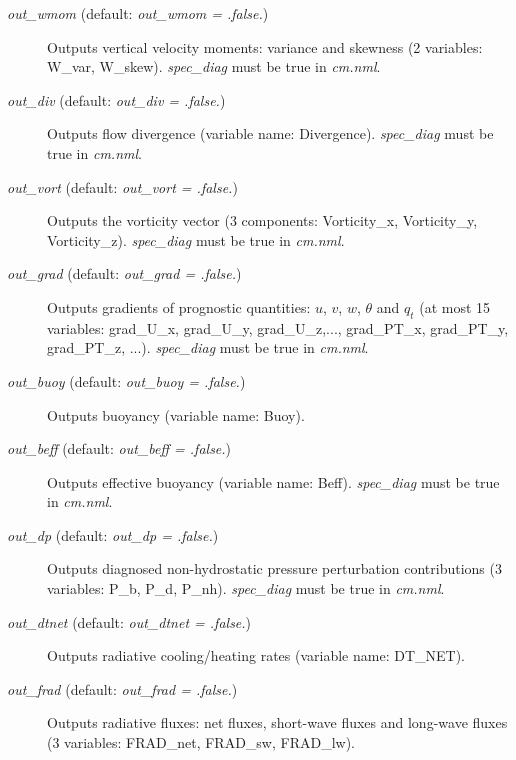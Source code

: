 \documentclass[12pt,A4,french]{article}
\begin{document}
\begin{description}
\item[{\it out\_wmom} (default: {\it out\_wmom = .false.})]

Outputs vertical velocity moments: variance and skewness (2 variables: W\_var, W\_skew). {\it spec\_diag} must be true in {\it cm.nml}.

\item[{\it out\_div} (default: {\it out\_div = .false.})]

Outputs flow divergence (variable name: Divergence). {\it spec\_diag} must be true in {\it cm.nml}.

\item[{\it out\_vort} (default: {\it out\_vort = .false.})]

Outputs the vorticity vector (3 components: Vorticity\_x, Vorticity\_y, Vorticity\_z). {\it spec\_diag} must be true in {\it cm.nml}.

\item[{\it out\_grad} (default: {\it out\_grad = .false.})]

Outputs gradients of prognostic quantities: $u$, $v$, $w$, $\theta$ and $q_t$ (at most 15 variables: grad\_U\_x, grad\_U\_y, grad\_U\_z,..., grad\_PT\_x, grad\_PT\_y, grad\_PT\_z, ...). {\it spec\_diag} must be true in {\it cm.nml}.

\item[{\it out\_buoy} (default: {\it out\_buoy = .false.})]

Outputs buoyancy (variable name: Buoy).

\item[{\it out\_beff} (default: {\it out\_beff = .false.})]

Outputs effective buoyancy (variable name: Beff). {\it spec\_diag} must be true in {\it cm.nml}.

\item[{\it out\_dp} (default: {\it out\_dp = .false.})]

Outputs diagnosed non-hydrostatic pressure perturbation contributions (3 variables: P\_b, P\_d, P\_nh). {\it spec\_diag} must be true in {\it cm.nml}.

\item[{\it out\_dtnet} (default: {\it out\_dtnet = .false.})]

Outputs radiative cooling/heating rates (variable name: DT\_NET).

\item[{\it out\_frad} (default: {\it out\_frad = .false.})]

Outputs radiative fluxes: net fluxes, short-wave fluxes and long-wave fluxes (3 variables: FRAD\_net, FRAD\_sw, FRAD\_lw).


\end{description}
\end{document}
